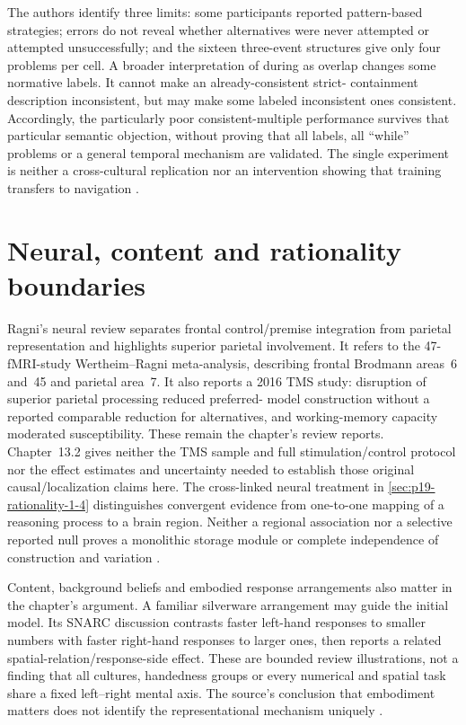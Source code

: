 The authors identify three limits: some participants reported pattern-based
strategies; errors do not reveal whether alternatives were never attempted
or attempted unsuccessfully; and the sixteen three-event structures give
only four problems per cell. A broader interpretation of during as overlap
changes some normative labels. It cannot make an already-consistent strict-
containment description inconsistent, but may make some labeled inconsistent
ones consistent. Accordingly, the particularly poor consistent-multiple
performance survives that particular semantic objection, without proving
that all labels, all ``while'' problems or a general temporal mechanism are
validated. The single experiment is neither a cross-cultural replication
nor an intervention showing that training transfers to navigation
\cite[pp.~5--6]{KellyKhemlani2019Durative}.

\section{Neural, content and rationality boundaries}
\label{sec:p19-rat132-limits}

Ragni's neural review separates frontal control/premise integration from
parietal representation and highlights superior parietal involvement.
It refers to the 47-fMRI-study Wertheim--Ragni meta-analysis, describing
frontal Brodmann areas~6 and~45 and parietal area~7. It also reports a
2016 TMS study: disruption of superior parietal processing reduced preferred-
model construction without a reported comparable reduction for alternatives,
and working-memory capacity moderated susceptibility. These remain the
chapter's review reports. Chapter~13.2 gives neither the TMS sample and
full stimulation/control protocol nor the effect estimates and uncertainty
needed to establish those original causal/localization claims here.
The cross-linked neural treatment in
\cref{sec:p19-rationality-1-4} distinguishes convergent evidence from
one-to-one mapping of a reasoning process to a brain region. Neither a
regional association nor a selective reported null proves a monolithic
storage module or complete independence of construction and variation
\cite[sec.~4, p.~729]{Ragni2021SpatialTemporal}.

Content, background beliefs and embodied response arrangements also matter
in the chapter's argument. A familiar silverware arrangement may guide
the initial model. Its SNARC discussion contrasts faster left-hand responses
to smaller numbers with faster right-hand responses to larger ones, then
reports a related spatial-relation/response-side effect. These are bounded
review illustrations, not a finding that all cultures, handedness groups
or every numerical and spatial task share a fixed left--right mental axis.
The source's conclusion that embodiment matters does not identify the
representational mechanism uniquely \cite[secs.~5--6]{Ragni2021SpatialTemporal}.

